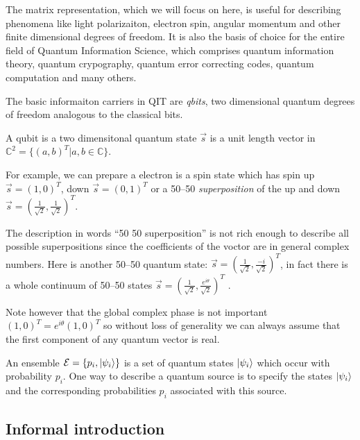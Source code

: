 \documentclass[aps,11pt,twoside,letterpaper]{article}
\def\c{\mathbb{C}}
\def\E{\mathcal{E}}
\theoremstyle{plain}
\theoremstyle{definition}
\begin{document}
        The matrix representation, which we will focus on here,  is useful for describing 
        phenomena like light polarizaiton, electron spin, angular momentum and other 
        finite dimensional degrees of freedom.
        It is also the basis of choice for the entire field of Quantum Information Science,
        which comprises quantum information theory, quantum crypography, quantum error correcting codes, 
        quantum computation and many others.

        The basic informaiton carriers in QIT are \emph{qbits}, two dimensional quantum degrees
        of freedom analogous to the classical bits. 

        \begin{definition}[qubit]
            A qubit is a two dimensitonal quantum state $\vec{s}$ is a 
            unit length vector in $\c^2 = \{(a,b)^T| a,b \in \c\}$.
        \end{definition}

        For example, we can prepare a electron is a spin state which has spin up $\vec{s}=(1,0)^T$,
        down $\vec{s}=(0,1)^T$ or a 50--50 \emph{superposition} of the up and down $\vec{s} = (\frac{1}{\sqrt{2}}, \frac{1}{\sqrt{2}})^T$.

        The description in words ``50 50 superposition'' is not rich enough to describe all possible superpositions since
        the coefficients of the voctor are in general complex numbers. 
        Here is another 50--50 quantum state: $\vec{s} = (\frac{1}{\sqrt{2}}, \frac{-i}{\sqrt{2}})^T$, in fact there is a
        whole continuum of 50--50  states $\vec{s} = (\frac{1}{\sqrt{2}}, \frac{e^{i\theta}}{\sqrt{2}})^T$ .

        Note however that the global complex phase is not important $(1,0)^T= e^{i\theta}(1,0)^T$ so without loss
        of generality we can always assume that the first component of any quantum vector is real.


        An ensemble $\E=\{p_i, \ket{\psi_i} \}$ is a set of quantum states $| \psi_i \rangle$ which occur with 
        probability $p_i$. 
        One way to describe a quantum source is to specify the states $| \psi_i \rangle$ and the
        corresponding probabilities $p_i$ associated with this source. 


    \subsection{Informal introduction}
\end{document}
